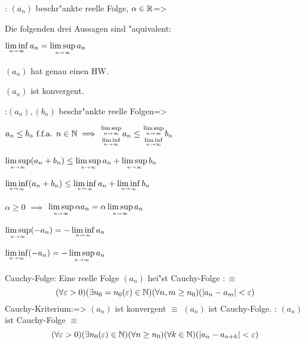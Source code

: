 \theorem:
  $(a_n)$ beschr"ankte reelle Folge, $\alpha\in\mathbb R$=>{
  Die folgenden drei Aussagen sind "aquivalent:
  \begin{stmts}
    \item $\liminfn a_n = \limsupn a_n$
    \item $(a_n)$ hat genau einen HW.
    \item $(a_n)$ ist konvergent.
    \end{stmts}
  }
\lessertheorem:$(a_n),(b_n)$ beschr"ankte reelle Folgen=>{
  \begin{stmts}
    \item $a_n\le b_n \ffa n\natural\implies
      \stack(\limsupn;\liminfn) a_n \le
      \stack(\limsupn;\liminfn) b_n$ 
    \item $\limsupn (a_n+b_n) \le
      \limsupn a_n+\limsupn b_n$ 
      
      $\liminfn (a_n+b_n) \le
      \liminfn a_n+\liminfn b_n$ 
    \item $\alpha\ge 0$ $\implies$ $\limsupn \alpha a_n = \alpha\limsupn a_n$
    \item $\limsupn (-a_n)=-\liminfn a_n$ 
    \item $\liminfn (-a_n)=-\limsupn a_n$ 
    \end{stmts}
  }
 Cauchy-Folge:{
  Eine reelle Folge $(a_n)$ hei"st Cauchy-Folge $:\equiv$
  \[(\forall \varepsilon>0)(\exists n_0=n_0(\varepsilon)\in\mathbb N)(\forall n,m\ge n_0)(|a_n-a_m|<\varepsilon)
    \]
  }
\theorem Cauchy-Kriterium:=>{
  $(a_n)$ ist konvergent $\equiv$ $(a_n)$ ist Cauchy-Folge.
  }
\remark:{
  $(a_n)$ ist Cauchy-Folge $\equiv$
  \[(\forall \varepsilon>0)(\exists n_0(\varepsilon)\in\mathbb N)(\forall n\ge n_0)(\forall k\in\mathbb N)
    (|a_n-a_{n+k}|<\varepsilon)
    \]
  }
